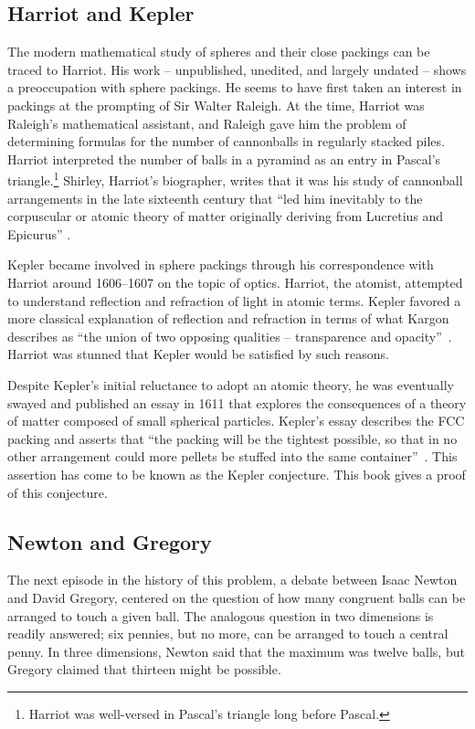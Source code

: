 \subsection{Harriot and Kepler}

The modern mathematical study of spheres and their close packings can
be traced to Harriot.  His work -- unpublished, unedited, and
largely undated -- shows a preoccupation with sphere packings.  He
seems to have first taken an interest in packings at the prompting of
Sir Walter Raleigh.  At the time, Harriot was Raleigh's mathematical
assistant, and Raleigh gave him the problem of determining formulas
for the number of cannonballs in regularly stacked piles.  Harriot
interpreted the number of balls in a pyramind as an entry in Pascal's
triangle.\footnote{Harriot was well-versed in Pascal's triangle long
  before Pascal.}  Shirley, Harriot's biographer, writes that it was
his study of cannonball arrangements in the late sixteenth century
that  ``led him inevitably to the corpuscular or atomic
theory of matter originally deriving from Lucretius and Epicurus''
\cite[p.~242]{Shi83}.

Kepler became involved in sphere packings through his correspondence
with Harriot around 1606--1607 on the topic of optics.
Harriot, the atomist, attempted to understand reflection and refraction
of light in atomic terms.  Kepler favored a more classical explanation of
reflection and refraction in terms of what Kargon describes as ``the union of two opposing
qualities -- transparence and opacity''~\cite[p.26]{Kar66}.  
Harriot was stunned that
Kepler would be satisfied by such reasons.

Despite Kepler's initial reluctance to adopt an atomic
theory, he was eventually swayed and  published an essay in  1611
that explores the consequences of a theory of matter composed of small
spherical particles. 
Kepler's essay describes the FCC packing and asserts
that ``the packing will be the tightest possible, so that in no other
arrangement could more pellets be stuffed into the same
container''~\cite{Kep66}.  This assertion has come to be known as the
Kepler conjecture.  This book
gives a proof of this conjecture.

\subsection{Newton and Gregory}

The next episode in the history of this problem,  a debate between
Isaac Newton and David Gregory,  centered on the
question of how many congruent balls  can be arranged to touch
a given ball.  The analogous question in two dimensions is readily answered;
six pennies, but no more, can be arranged
to touch a central penny.  In three dimensions, Newton said that the maximum was
twelve balls, but Gregory claimed that thirteen might be possible.

